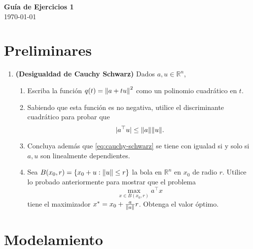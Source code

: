 \documentclass{article}
\begin{document}


\begin{center}
    \Huge{\textbf{Guía de Ejercicios 1}}\\
    \normalsize
    \today
\end{center}

\section{Preliminares}

\begin{enumerate}
	\item \textbf{(Desigualdad de Cauchy Schwarz)} Dados \(a, u \in \mathbb{R}^n\),
		\begin{enumerate}
			\item Escriba la función \(q(t) = \norm{a + tu}^2\) como un polinomio cuadrático en \(t\).
			\item Sabiendo que esta función es no negativa, utilice el discriminante cuadrático para probar que
				\begin{equation} \label{eq:cauchy-schwarz}
					|a^\top u| \leq \norm{a} \norm{u}.
				\end{equation}
			\item Concluya además que \eqref{eq:cauchy-schwarz} se tiene con igualad si y solo si \(a, u\) son linealmente dependientes.
			\item Sea \(B(x_0, r) = \qty{x_0 + u : \norm{u} \leq r}\) la bola en \(\mathbb{R}^n\) en \(x_0\) de radio \(r\). Utilice lo probado anteriormente para mostrar que el problema
				\[
					\max_{x \in B(x_0, r)} a^\top x
				\]
				tiene el maximizador \(x^* = x_0 + \frac{a}{\norm{a}} r\). Obtenga el valor óptimo.
		\end{enumerate}
\end{enumerate}

\section{Modelamiento}
\end{document}
